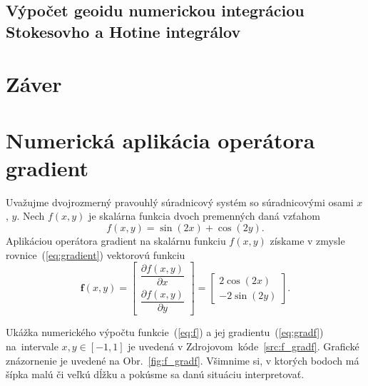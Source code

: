 \documentclass[a4paper, 12pt]{book}
\let\vec\mathbf
\begin{document}
{%

\section{Výpočet geoidu numerickou integráciou Stokesovho a Hotine integrálov}







\chapter*{Záver}







\appendix
\chapter{Numerická aplikácia operátora gradient}
\label{app:numerical_application_of_gradient}

Uvažujme dvojrozmerný pravouhlý súradnicový systém so súradnicovými osami $x$, 
$y$.  Nech $f(x, y)$ je skalárna funkcia dvoch premenných daná vzťahom
%
\begin{equation}
\label{eq:f}
f(x, y) = \sin(2x) + \cos(2y){.}
\end{equation}
%
Aplikáciou operátora gradient na skalárnu funkciu $f(x, y)$ získame v zmysle 
rovnice~(\ref{eq:gradient}) vektorovú funkciu
%
\begin{equation}
\label{eq:gradf}
\vec f(x, y) =
\begin{bmatrix}
\dfrac{\partial f(x, y)}{\partial x} \\[2ex]
\dfrac{\partial f(x, y)}{\partial y}
\end{bmatrix}
=
\begin{bmatrix}
2 \cos(2x) \\[2ex]
-2 \sin(2y)
\end{bmatrix}
{.}
\end{equation}

Ukážka numerického výpočtu funkcie~(\ref{eq:f}) a jej 
gradientu~(\ref{eq:gradf}) na~intervale $x, y \in [-1, 1]$ je uvedená 
v Zdrojovom~kóde~\ref{src:f_gradf}.  Grafické znázornenie je uvedené na 
Obr.~\ref{fig:f_gradf}.  Všimnime si, v ktorých bodoch má šípka malú či veľkú 
dĺžku a pokúsme sa danú situáciu interpretovať.

}
\end{document}
